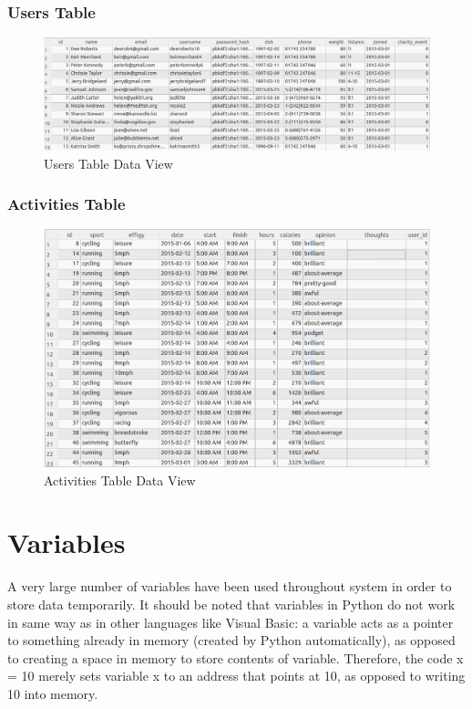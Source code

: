 \documentclass{article}[12pt,a4paper]
\begin{document}
\subsubsection{Users Table}
\begin{figure}[h!]
  \includegraphics[scale=0.37]{images/database/users_visual}
  \caption{Users Table Data View}
\end{figure}

\subsubsection{Activities Table}
\begin{figure}[h!]
  \includegraphics[scale=0.37]{images/database/activities_visual}
  \caption{Activities Table Data View}
\end{figure}

\section{Variables}
A very large number of variables have been used throughout system in order to store data temporarily. It should be noted that variables in Python do not work in same way as in other languages like Visual Basic: a variable acts as a pointer to something already in memory (created by Python automatically), as opposed to creating a space in memory to store contents of variable. Therefore, the code x = 10 merely sets variable x to an address that points at 10, as opposed to writing 10 into memory.
\end{document}
